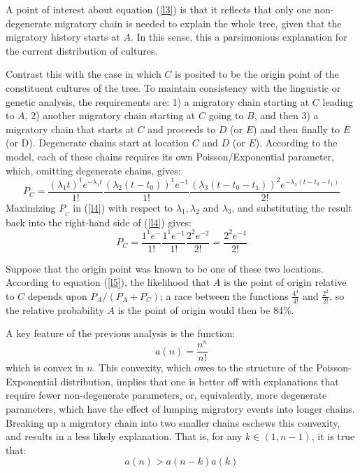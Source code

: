 \documentclass[11pt]{article}
\begin{document}
A point of interest about equation (\ref{l3}) is that it reflects that only one non-degenerate migratory chain is needed to explain the whole tree, given that the migratory history starts at $A$. In this sense, this a parsimonious explanation for the current distribution of cultures. 

Contrast this with the case in which $C$ is posited to be the origin point of the constituent cultures of the tree. To maintain consistency with the linguistic or genetic analysis, the requirements are:  1) a migratory chain starting at $C$ leading to $A$, 2) another migratory chain starting at $C$ going to $B$, and then 3) a migratory chain that starts at $C$ and proceeds to $D$ (or $E$) and then finally to $E$ (or D). Degenerate chains start at location $C$ and $D$ (or $E$). According to the model, each of these chains requires its own Poisson/Exponential parameter, which, omitting degenerate chains, gives:
\begin{equation} \label{l4}
P_{C}=\frac{(\lambda_1t)^1e^{-\lambda_1t}}{1!}\frac{(\lambda_2(t-t_0))^1e^{-1}}{1!}
\frac{(\lambda_3(t-t_0-t_1))^2e^{-\lambda_3(t-t_0-t_1)}}{2!}
\end{equation} 
Maximizing $P_{}_{C}$ in (\ref{l4}) with respect to $\lambda_1,\lambda_2$ and $\lambda_3$, and substituting the result back into the right-hand side of (\ref{l4}) gives:
\begin{equation} \label{l5}
P_{C}=\frac{1^1e^{-}}{1!}\frac{1^{1}e^{-1}}{1!}\frac{2^2e^{-2}}{2!}=
\frac{2^2e^{-4}}{2!}
\end{equation} 

Suppose that the origin point was known to be one of these two locations. According to equation (\ref{l5}), the likelihood that $A$ is the point of origin relative to $C$ depends upon $P_A /(P_A+P_C)$; a race between the functions $\frac{4^4}{4!}$ and $\frac{2^2}{2!}$, so the relative probability  $A$ is the point of origin would then be 84\%. 

A key feature of the previous analysis is the function: 
\begin{equation*}
a(n)=\frac{n^n}{n!}
\end{equation*}
which is convex in $n$. This convexity, which owes to the structure of the Poisson-Exponential distribution, implies that one is better off with explanations that require fewer non-degenerate parameters, or, equivalently, more degenerate parameters, which have the effect of lumping migratory events into longer chains. Breaking up a migratory chain into two smaller chains eschews this convexity, and results in a less likely explanation. That is, for any  $k \in (1,n-1)$, it is true that:
\begin{equation*}
a(n) > a(n-k)a(k)
\end{equation*} 
\end{document}

